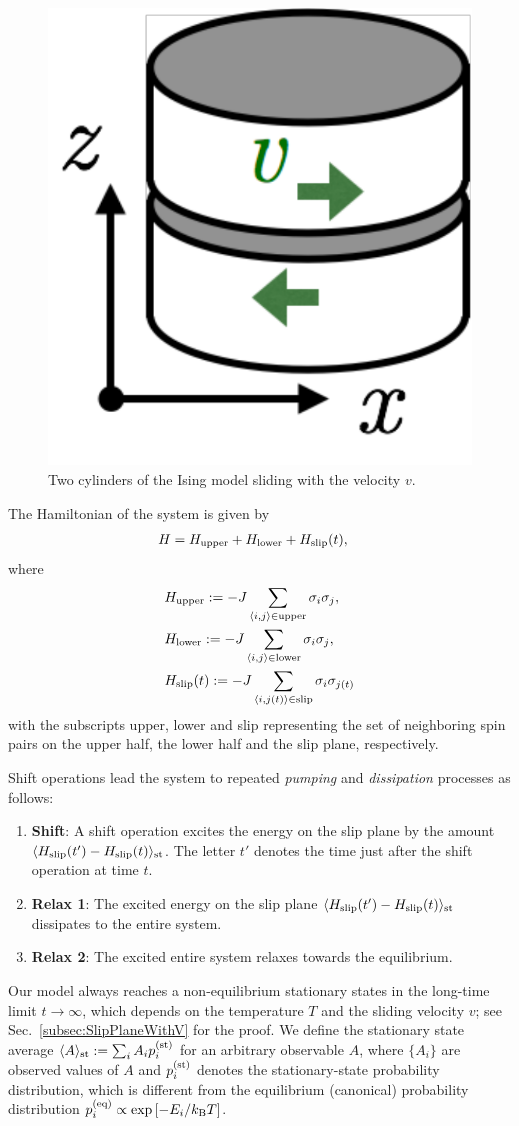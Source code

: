 \begin{figure}[htbp]
	\centering
	\includegraphics[width=0.40\linewidth]{CutIsing.pdf}
	\caption{Two cylinders of the Ising model sliding with the velocity $v$.}
	\label{fig:CutIsing}
\end{figure}
The Hamiltonian of the system is given by
\begin{align}
&H=H_{\rm upper} + H_{\rm lower} + H_{\rm slip}(t),
\end{align}
where
\begin{align}
&H_{\rm upper}:=-J\sum_{\langle i,j\rangle\in\mathrm{upper}}\sigma_{i}\sigma_{j}\label{ham:upper}, \\
&H_{\rm lower}:=-J\sum_{\langle i,j\rangle\in\mathrm{lower}}\sigma_{i}\sigma_{j}\label{ham:lower}, \\
&H_{\rm slip}(t):=-J\sum_{\langle i,j(t)\rangle\in\mathrm{slip}}\sigma_{i}\sigma_{j(t)}\label{ham:slip}
\end{align}
with the subscripts upper, lower and slip representing the set of neighboring spin pairs on the upper half, the lower half and the slip plane, respectively.

Shift operations lead the system to repeated \textit{pumping} and \textit{dissipation} processes as follows:
\begin{enumerate}
	\item \textbf{Shift}: A shift operation excites the energy on the slip plane by the amount $\langle H_{\rm slip}(t')-H_{\rm slip}(t)\rangle_{\rm st}$. The letter $t'$ denotes the time just after the shift operation at time $t$.
	\item \textbf{Relax 1}: The excited energy on the slip plane $\langle H_{\rm slip}(t')-H_{\rm slip}(t)\rangle_{\rm st}$ dissipates to the entire system.
	\item \textbf{Relax 2}: The excited entire system relaxes towards the equilibrium.
\end{enumerate}
Our model always reaches a non-equilibrium stationary states in the long-time limit $t\to\infty$, which depends on the temperature $T$ and the sliding velocity $v$; see Sec.~\ref{subsec:SlipPlaneWithV} for the proof. We define the stationary state average $\langle A\rangle_{\rm st}:=\sum_{i}A_{i}p^{(\rm st)}_{i}$ for an arbitrary observable $A$, where $\{A_{i}\}$ are observed values of $A$ and $p^{(\rm st)}_{i}$ denotes the stationary-state probability distribution, which is different from the equilibrium (canonical) probability distribution $p^{(\rm eq)}_{i}\propto\exp\left[-E_{i}/k_{\rm B} T\right]$.

